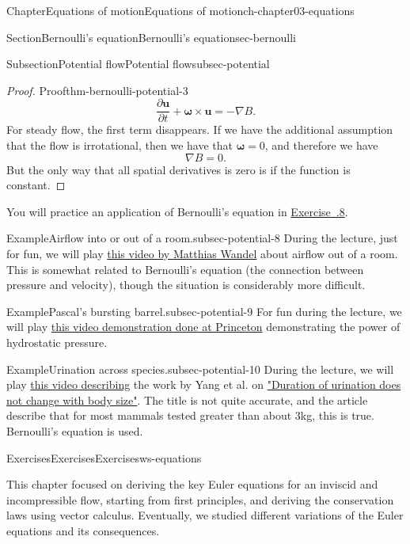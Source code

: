 \documentclass[oneside,10pt,]{book}
\newcommand{\xreffont}{\relax}
\numberwithin{equation}{section}
\newcommand{\pd}[2]{\frac{\partial#1}{\partial#2}}
\newcommand{\bu}{\boldsymbol{u}}
\newcommand{\bomega}{\boldsymbol{\omega}}
\begin{document}
\begin{chapterptx}{Chapter}{Equations of motion}{}{Equations of motion}{}{}{ch-chapter03-equations}
\begin{sectionptx}{Section}{Bernoulli's equation}{}{Bernoulli's equation}{}{}{sec-bernoulli}
\begin{subsectionptx}{Subsection}{Potential flow}{}{Potential flow}{}{}{subsec-potential}
\begin{proof}{Proof}{}{thm-bernoulli-potential-3}
\begin{equation*}
\pd{\bu}{t} + \bomega \times \bu = -\nabla B.
\end{equation*}
For steady flow, the first term disappears. If we have the additional assumption that the flow is irrotational, then we have that \(\bomega = 0\), and therefore we have%
\begin{equation*}
\nabla B = 0.
\end{equation*}
But the only way that all spatial derivatives is zero is if the function is constant.%
\end{proof}
You will practice an application of Bernoulli's equation in \hyperlink{ex-bernoulli-streamline}{Exercise~{\xreffont 3.6.8}}.%
\begin{example}{Example}{Airflow into or out of a room.}{subsec-potential-8}%
During the lecture, just for fun, we will play \href{https://www.youtube.com/watch?v=1L2ef1CP-yw}{this video by Matthias Wandel} about airflow out of a room. This is somewhat related to Bernoulli's equation (the connection between pressure and velocity), though the situation is considerably more difficult.%
\end{example}
\begin{example}{Example}{Pascal's bursting barrel.}{subsec-potential-9}%
For fun during the lecture, we will play \href{https://www.youtube.com/watch?v=EJHrr21UvY8}{this video demonstration done at Princeton} demonstrating the power of hydrostatic pressure.%
\end{example}
\begin{example}{Example}{Urination across species.}{subsec-potential-10}%
During the lecture, we will play \href{https://www.youtube.com/watch?v=EidLGwyYpBE}{this video describing} the work by Yang et al. on \href{https://www.pnas.org/doi/pdf/10.1073/pnas.1402289111}{"Duration of urination does not change with body size"}. The title is not quite accurate, and the article describe that for most mammals tested greater than about 3kg, this is true. Bernoulli's equation is used.%
\end{example}
\end{subsectionptx}
\end{sectionptx}
%
%
\typeout{************************************************}
\typeout{************************************************}
%
\begin{exercises-section}{Exercises}{Exercises}{}{Exercises}{}{}{ws-equations}
\begin{introduction}{}%
This chapter focused on deriving the key Euler equations for an inviscid and incompressible flow, starting from first principles, and deriving the conservation laws using vector calculus. Eventually, we studied different variations of the Euler equations and its consequences.%

\end{introduction}
\end{exercises-section}
\end{chapterptx}
\end{document}
